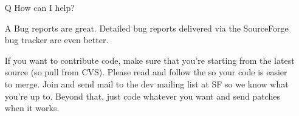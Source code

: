 \documentclass{article}
\begin{document}
\begin{itemize}
\item[Q] How can I help?

\item[A] Bug reports are great. Detailed bug reports delivered via the 
 SourceForge bug tracker are even better. 
 
 If you want to contribute code, make sure that you're starting 
 from the latest source (so pull from CVS). Please read and follow
 the 
 so your code is easier to merge. Join and send mail to the dev mailing
 list at SF so we know what you're up to. Beyond that, just code whatever
 you want and send patches when it works.

\end{itemize}
\end{document}
